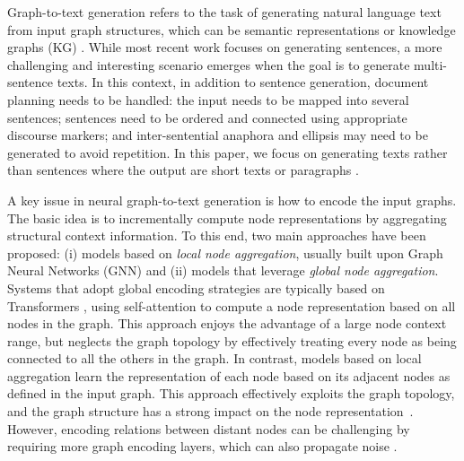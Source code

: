 \documentclass[11pt,a4paper]{article}
\begin{document}
Graph-to-text generation refers to the task of generating natural language text from input graph structures, which can be semantic representations \cite{konsas_17} or knowledge graphs (KG) \cite{gardent-etal-2017-webnlg, koncel-kedziorski-etal-2019-text}.
While most recent work \cite{song-etal-acl2018, ribeiro-etal-2019-enhancing, dcgcnforgraph2seq19guo} focuses on generating sentences, 
a more challenging and interesting scenario emerges when the goal is to generate multi-sentence texts. In this context, in addition to sentence generation, document planning needs to be handled: 
the input needs to be mapped into several sentences; sentences need to be ordered and connected using appropriate discourse markers; and inter-sentential anaphora and ellipsis may need to be generated to avoid repetition. In this paper, we focus on generating texts rather than sentences where the output are short texts \cite{gardent-etal-2017-webnlg} or paragraphs \cite{koncel-kedziorski-etal-2019-text}. 



A key issue in neural graph-to-text generation is how to encode the input graphs. The basic idea is to incrementally compute node representations by aggregating structural context information.  
To this end, two main approaches have been proposed: (i) models based on \textit{local node aggregation}, usually built upon Graph Neural Networks (GNN) \cite{Kipf:2016tc, NIPS2017_6703} and (ii) models that leverage \textit{global node aggregation}. Systems that adopt global encoding strategies are typically based on Transformers \cite{NIPS2017_7181}, using self-attention to compute a node representation based on all nodes in the graph. This approach enjoys the advantage of a large node context range, but neglects the graph topology by effectively treating every node as being connected to all the others in the graph. In contrast, models based on local aggregation learn the representation of each node based on its adjacent nodes as defined in the input graph. This approach effectively exploits the graph topology, and the graph structure has a strong impact on the node representation~\cite{Xu2018RepresentationLO}. However, encoding relations between distant nodes can be challenging by requiring more graph encoding layers, which can also propagate noise \cite{li2018deeper}.
\end{document}
